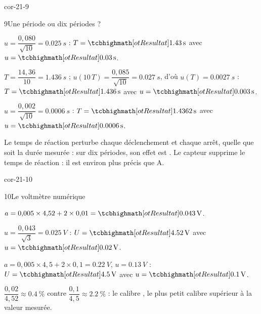 \begin{blocLivre}{cor-21-9}
\begin{corrige}{9}{Une période ou dix périodes ?}
\begin{questions}
\item $u=\dfrac{0{,}080}{\sqrt{10}}=\qty{0,025}{s}$ : $T=\res{\qty{1,43}{s}}$ avec $u=\res{\qty{0,03}{s}}$.
\item $T=\dfrac{14{,}36}{10}=\qty{1,436}{s}$ ; $u(10\,T)=\dfrac{0{,}085}{\sqrt{10}}=\qty{0,027}{s}$, d'où $u(T)=\qty{0,0027}{s}$ : $T=\res{\qty{1,436}{s}}$ avec $u=\res{\qty{0,003}{s}}$.
\item $u=\dfrac{0{,}002}{\sqrt{10}}=\qty{0,0006}{s}$ : $T=\res{\qty{1,4362}{s}}$ avec $u=\res{\qty{0,0006}{s}}$.
\item Le temps de réaction perturbe chaque déclenchement et chaque arrêt, quelle que soit la durée mesurée : sur dix périodes, son
effet est . Le capteur supprime le temps de réaction : il est environ  plus précis que A.
\end{questions}
\end{corrige}
\end{blocLivre}
\begin{blocLivre}{cor-21-10}
\begin{corrige}{10}{Le voltmètre numérique}
\begin{questions}
\item $a=0{,}005\times4{,}52+2\times0{,}01=\res{\qty{0,043}{V}}$.
\item $u=\dfrac{0{,}043}{\sqrt{3}}=\qty{0,025}{V}$ : $U=\res{\qty{4,52}{V}}$ avec $u=\res{\qty{0,02}{V}}$.
\item $a=0{,}005\times4{,}5+2\times0{,}1=\qty{0,22}{V}$, $u=\qty{0,13}{V}$ : $U=\res{\qty{4,5}{V}}$ avec $u=\res{\qty{0,1}{V}}$.
\item $\dfrac{0{,}02}{4{,}52}\approx\qty{0,4}{\percent}$ contre $\dfrac{0{,}1}{4{,}5}\approx\qty{2,2}{\percent}$ : le calibre , le plus petit calibre supérieur à la valeur mesurée.
\end{questions}
\end{corrige}
\end{blocLivre}
